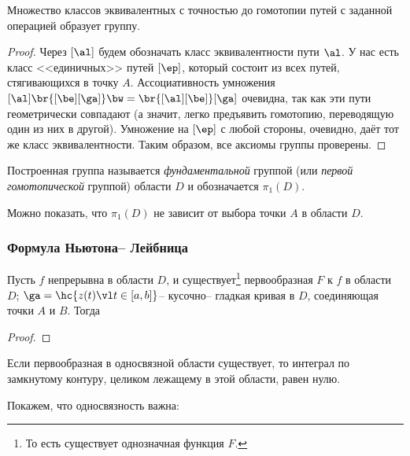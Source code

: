 \documentclass[a4paper]{article}
\begin{document}
\begin{stm}
Множество классов эквивалентных с точностью до гомотопии путей с заданной операцией образует группу.
\end{stm}
\begin{proof}
Через $[\al]$ будем обозначать класс эквивалентности пути $\al$. У нас есть класс <<единичных>> путей
$[\ep]$, который состоит из всех путей, стягивающихся в точку $A$. Ассоциативность умножения
$[\al]\br{[\be][\ga]} \bw= \br{[\al][\be]}[\ga]$ очевидна, так как эти пути геометрически совпадают (а
значит, легко предъявить гомотопию, переводящую один из них в другой). Умножение на $[\ep]$ с любой стороны,
очевидно, даёт тот же класс эквивалентности. Таким образом, все аксиомы группы проверены.
\end{proof}

\begin{df}
Построенная группа называется \emph{фундаментальной} группой (или \emph{первой гомотопической} группой)
области $D$ и обозначается $\pi_1(D)$.
\end{df}

Можно показать, что $\pi_1(D)$ не зависит от выбора точки $A$ в области $D$.


\subsubsection{Формула Ньютона-- Лейбница}

\begin{theorem}
Пусть $f$ непрерывна в области $D$, и существует\footnote{То есть существует однозначная функция $F$.} первообразная $F$ к $f$ в области $D$;
$\ga=\hc{z(t) \vl t \in [a,b]}$-- кусочно-- гладкая кривая в $D$, соединяющая точки $A$ и $B$.
Тогда
\end{theorem}
\begin{proof}
\hfill\end{proof}
\begin{imp}
Если первообразная в односвязной области существует, то интеграл по замкнутому контуру, целиком лежащему в
этой области, равен нулю.
\end{imp}

\begin{ex}
Покажем, что односвязность важна:
\end{ex}
\end{document}
